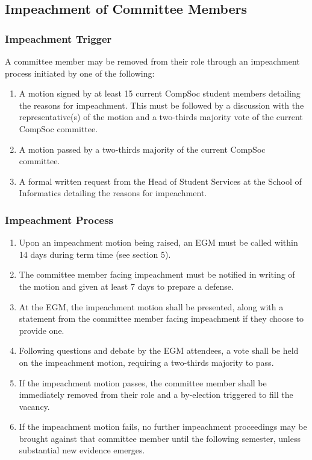 \subsection{Impeachment of Committee Members}
\subsubsection{Impeachment Trigger}
A committee member may be removed from their role through an impeachment process initiated by one of the following:
\begin{enumerate}
\item A motion signed by at least 15 current CompSoc student members detailing the reasons for impeachment. This must be followed by a discussion with the representative(s) of the motion and a two-thirds majority vote of the current CompSoc committee.
\item A motion passed by a two-thirds majority of the current CompSoc committee.
\item A formal written request from the Head of Student Services at the School of Informatics detailing the reasons for impeachment.
\end{enumerate}

\subsubsection{Impeachment Process}
\begin{enumerate}
\item Upon an impeachment motion being raised, an EGM must be called within 14 days during term time (see section 5).
\item The committee member facing impeachment must be notified in writing of the motion and given at least 7 days to prepare a defense.
\item At the EGM, the impeachment motion shall be presented, along with a statement from the committee member facing impeachment if they choose to provide one.
\item Following questions and debate by the EGM attendees, a vote shall be held on the impeachment motion, requiring a two-thirds majority to pass.
\item If the impeachment motion passes, the committee member shall be immediately removed from their role and a by-election triggered to fill the vacancy.
\item If the impeachment motion fails, no further impeachment proceedings may be brought against that committee member until the following semester, unless substantial new evidence emerges.
\end{enumerate}